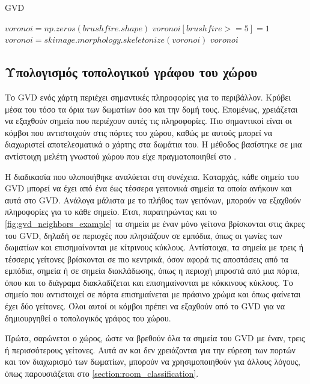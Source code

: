 \begin{algorithm}[!ht]
\caption{GVD}
\label{alg:gvd}
\begin{algorithmic}[1]
        \State $voronoi = np.zeros(brushfire.shape)$
        \State $voronoi[brushfire >= 5] = 1$
        \State $voronoi = skimage.morphology.skeletonize(voronoi)$
        \State \Return $voronoi$
\end{algorithmic}
\end{algorithm}



\subsection{Υπολογισμός τοπολογικού γράφου του χώρου}
\label{subsection:find_topology}

Το GVD ενός χάρτη περιέχει σημαντικές πληροφορίες για το περιβάλλον. Κρύβει μέσα του τόσο τα όρια των δωματίων όσο και την δομή τους. Επομένως, χρειάζεται να εξαχθούν σημεία που περιέχουν αυτές τις πληροφορίες. Πιο σημαντικοί είναι οι κόμβοι που αντιστοιχούν στις πόρτες του χώρου, καθώς με αυτούς μπορεί να διαχωριστεί αποτελεσματικά ο χάρτης στα δωμάτια του. Η μέθοδος βασίστηκε σε μια αντίστοιχη μελέτη γνωστού χώρου που είχε πραγματοποιηθεί στο \cite{sikoudi}. 

Η διαδικασία που υλοποιήθηκε αναλύεται στη συνέχεια. Καταρχάς, κάθε σημείο του GVD μπορεί να έχει από ένα έως τέσσερα γειτονικά σημεία τα οποία ανήκουν και αυτά στο GVD. Ανάλογα μάλιστα με το πλήθος των γειτόνων, μπορούν να εξαχθούν πληροφορίες για το κάθε σημείο. Έτσι, παρατηρώντας και το \autoref{fig:gvd_neighbors_example} τα σημεία με έναν μόνο γείτονα βρίσκονται στις άκρες του GVD, δηλαδή σε περιοχές που πλησιάζουν σε εμπόδια, όπως οι γωνίες των δωματίων και επισημαίνονται με κίτρινους κύκλους. Αντίστοιχα, τα σημεία με τρεις ή τέσσερις γείτονες βρίσκονται σε πιο κεντρικά, όσον αφορά τις αποστάσεις από τα εμπόδια, σημεία ή σε σημεία διακλάδωσης, όπως η περιοχή μπροστά από μια πόρτα, όπου και το διάγραμα διακλαδίζεται και επισημαίνονται με κόκκινους κύκλους. Το σημείο που αντιστοιχεί σε πόρτα επισημαίνεται με πράσινο χρώμα και όπως φαίνεται έχει δύο γείτονες. Όλοι αυτοί οι κόμβοι πρέπει να εξαχθούν από το GVD για να δημιουργηθεί ο τοπολογικός γράφος του χώρου.

Πρώτα, σαρώνεται ο χώρος, ώστε να βρεθούν όλα τα σημεία του GVD με έναν, τρεις ή περισσότερους γείτονες. Αυτά αν και δεν χρειάζονται για την εύρεση των πορτών και τον διαχωρισμό των δωματίων, μπορούν να χρησιμοποιηθούν για άλλους λόγους, όπως παρουσιάζεται στο \ref{section:room_classification}.

